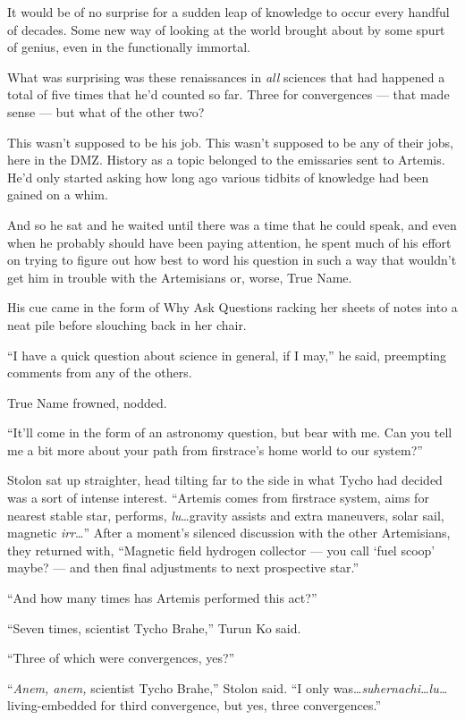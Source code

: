 It would be of no surprise for a sudden leap of knowledge to occur every handful of decades. Some new way of looking at the world brought about by some spurt of genius, even in the functionally immortal.

What was surprising was these renaissances in \emph{all} sciences that had happened a total of five times that he'd counted so far. Three for convergences --- that made sense --- but what of the other two?

This wasn't supposed to be his job. This wasn't supposed to be any of their jobs, here in the DMZ. History as a topic belonged to the emissaries sent to Artemis. He'd only started asking how long ago various tidbits of knowledge had been gained on a whim.

And so he sat and he waited until there was a time that he could speak, and even when he probably should have been paying attention, he spent much of his effort on trying to figure out how best to word his question in such a way that wouldn't get him in trouble with the Artemisians or, worse, True Name.

His cue came in the form of Why Ask Questions racking her sheets of notes into a neat pile before slouching back in her chair.

``I have a quick question about science in general, if I may,'' he said, preempting comments from any of the others.

True Name frowned, nodded.

``It'll come in the form of an astronomy question, but bear with me. Can you tell me a bit more about your path from firstrace's home world to our system?''

Stolon sat up straighter, head tilting far to the side in what Tycho had decided was a sort of intense interest. ``Artemis comes from firstrace system, aims for nearest stable star, performs, \emph{lu}\ldots gravity assists and extra maneuvers, solar sail, magnetic \emph{irr}\ldots{}'' After a moment's silenced discussion with the other Artemisians, they returned with, ``Magnetic field hydrogen collector — you call `fuel scoop' maybe? — and then final adjustments to next prospective star.''

``And how many times has Artemis performed this act?''

``Seven times, scientist Tycho Brahe,'' Turun Ko said.

``Three of which were convergences, yes?''

``\emph{Anem, anem,} scientist Tycho Brahe,'' Stolon said. ``I only was\ldots{}\emph{suhernachi\ldots lu\ldots{}} living-embedded for third convergence, but yes, three convergences.''

